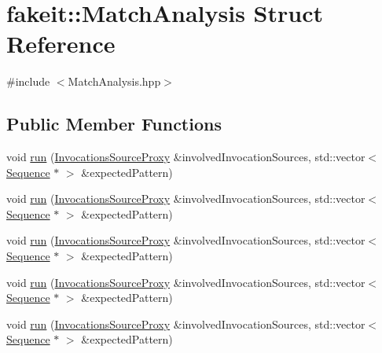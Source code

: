 \hypertarget{structfakeit_1_1MatchAnalysis}{}\section{fakeit\+::Match\+Analysis Struct Reference}
\label{structfakeit_1_1MatchAnalysis}


{\ttfamily \#include $<$Match\+Analysis.\+hpp$>$}

\subsection*{Public Member Functions}
\begin{DoxyCompactItemize}
\item 
void \mbox{\hyperlink{structfakeit_1_1MatchAnalysis_a6c064d01a4c375d30898208326ee3189}{run}} (\mbox{\hyperlink{structfakeit_1_1InvocationsSourceProxy}{Invocations\+Source\+Proxy}} \&involved\+Invocation\+Sources, std\+::vector$<$ \mbox{\hyperlink{classfakeit_1_1Sequence}{Sequence}} $\ast$ $>$ \&expected\+Pattern)
\item 
void \mbox{\hyperlink{structfakeit_1_1MatchAnalysis_a6c064d01a4c375d30898208326ee3189}{run}} (\mbox{\hyperlink{structfakeit_1_1InvocationsSourceProxy}{Invocations\+Source\+Proxy}} \&involved\+Invocation\+Sources, std\+::vector$<$ \mbox{\hyperlink{classfakeit_1_1Sequence}{Sequence}} $\ast$ $>$ \&expected\+Pattern)
\item 
void \mbox{\hyperlink{structfakeit_1_1MatchAnalysis_a6c064d01a4c375d30898208326ee3189}{run}} (\mbox{\hyperlink{structfakeit_1_1InvocationsSourceProxy}{Invocations\+Source\+Proxy}} \&involved\+Invocation\+Sources, std\+::vector$<$ \mbox{\hyperlink{classfakeit_1_1Sequence}{Sequence}} $\ast$ $>$ \&expected\+Pattern)
\item 
void \mbox{\hyperlink{structfakeit_1_1MatchAnalysis_a6c064d01a4c375d30898208326ee3189}{run}} (\mbox{\hyperlink{structfakeit_1_1InvocationsSourceProxy}{Invocations\+Source\+Proxy}} \&involved\+Invocation\+Sources, std\+::vector$<$ \mbox{\hyperlink{classfakeit_1_1Sequence}{Sequence}} $\ast$ $>$ \&expected\+Pattern)
\item 
void \mbox{\hyperlink{structfakeit_1_1MatchAnalysis_a6c064d01a4c375d30898208326ee3189}{run}} (\mbox{\hyperlink{structfakeit_1_1InvocationsSourceProxy}{Invocations\+Source\+Proxy}} \&involved\+Invocation\+Sources, std\+::vector$<$ \mbox{\hyperlink{classfakeit_1_1Sequence}{Sequence}} $\ast$ $>$ \&expected\+Pattern)
\item 

\end{DoxyCompactItemize}
